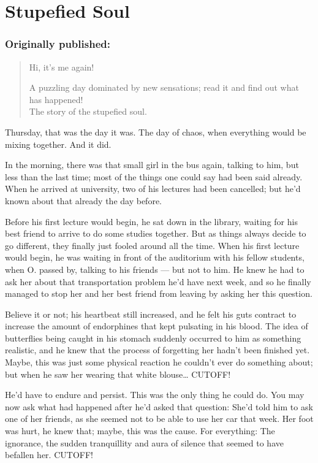 \chapter{Stupefied Soul}
\label{cha:stupefied-soul}
\subsection*{Originally published: }
\begin{quote}
Hi, it's me again!

A puzzling day dominated by new sensations; read it and find out what has happened!\\
The story of the stupefied soul. 
\end{quote}

Thursday, that was the day it was. The day of chaos, when everything would be mixing together. 
And it did.

In the morning, there was that small girl in the bus again, talking to him, but less than the last time; most of the things one could say had been said already. 
When he arrived at university, two of his lectures had been cancelled; but he'd known about that already the day before.

Before his first lecture would begin, he sat down in the library, waiting for his best friend to arrive to do some studies together. But as things always decide to go different, they finally just fooled around all the time. When his first lecture would begin, he was waiting in front of the auditorium with his fellow students, when O. passed by, talking to his friends --- but not to him. He knew he had to ask her about that transportation problem he'd have next week, and so he finally managed to stop her and her best friend from leaving by asking her this question.

Believe it or not; his heartbeat still increased, and he felt his guts contract to increase the amount of endorphines that kept pulsating in his blood. The idea of butterflies being caught in his stomach suddenly occurred to him as something realistic, and he knew that the process of forgetting her hadn't been finished yet. Maybe, this was just some physical reaction he couldn't ever do something about; but when he saw her wearing that white blouse\ldots
CUTOFF!

He'd have to endure and persist. 
This was the only thing he could do. 
You may now ask what had happened after he'd asked that question: She'd told him to ask one of her friends, as she seemed not to be able to use her car that week. Her foot was hurt, he knew that; maybe, this was the cause. 
For everything: The ignorance, the sudden tranquillity and aura of silence that seemed to have befallen her. 
CUTOFF!

